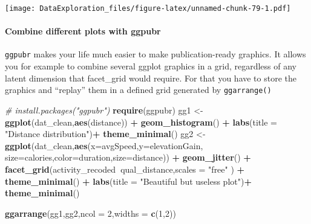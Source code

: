 \documentclass[
]{book}
\newenvironment{Shaded}{\begin{snugshade}}{\end{snugshade}}
\newcommand{\CommentTok}[1]{\textcolor[rgb]{0.56,0.35,0.01}{\textit{#1}}}
\newcommand{\DataTypeTok}[1]{\textcolor[rgb]{0.13,0.29,0.53}{#1}}
\newcommand{\DecValTok}[1]{\textcolor[rgb]{0.00,0.00,0.81}{#1}}
\newcommand{\KeywordTok}[1]{\textcolor[rgb]{0.13,0.29,0.53}{\textbf{#1}}}
\newcommand{\NormalTok}[1]{#1}
\newcommand{\OperatorTok}[1]{\textcolor[rgb]{0.81,0.36,0.00}{\textbf{#1}}}
\newcommand{\StringTok}[1]{\textcolor[rgb]{0.31,0.60,0.02}{#1}}
\begin{document}
\texttt{[image: DataExploration\_files/figure-latex/unnamed-chunk-79-1.pdf]}

\hypertarget{combine-different-plots-with-ggpubr}{%
\paragraph{Combine different plots with ggpubr}\label{combine-different-plots-with-ggpubr}}

\texttt{ggpubr} makes your life much easier to make publication-ready graphics. It allows you for example to combine several ggplot graphics in a grid, regardless of any latent dimension that facet\_grid would require. For that you have to store the graphics and ``replay'' them in a defined grid generated by \texttt{ggarrange()}

\begin{Shaded}
\begin{Highlighting}[]
\CommentTok{# install.packages("ggpubr")}
\KeywordTok{require}\NormalTok{(ggpubr)}
\NormalTok{gg1 <-}\StringTok{ }\KeywordTok{ggplot}\NormalTok{(dat_clean,}\KeywordTok{aes}\NormalTok{(distance)) }\OperatorTok{+}\StringTok{ }\KeywordTok{geom_histogram}\NormalTok{() }\OperatorTok{+}\StringTok{ }
\StringTok{  }\KeywordTok{labs}\NormalTok{(}\DataTypeTok{title =} \StringTok{"Distance distribution"}\NormalTok{)}\OperatorTok{+}
\StringTok{  }\KeywordTok{theme_minimal}\NormalTok{()}
\NormalTok{gg2 <-}\StringTok{ }\KeywordTok{ggplot}\NormalTok{(dat_clean,}\KeywordTok{aes}\NormalTok{(}\DataTypeTok{x=}\NormalTok{avgSpeed,}\DataTypeTok{y=}\NormalTok{elevationGain,}
                            \DataTypeTok{size=}\NormalTok{calories,}\DataTypeTok{color=}\NormalTok{duration,}\DataTypeTok{size=}\NormalTok{distance)) }\OperatorTok{+}\StringTok{ }
\StringTok{  }\KeywordTok{geom_jitter}\NormalTok{() }\OperatorTok{+}\StringTok{ }
\StringTok{  }\KeywordTok{facet_grid}\NormalTok{(activity_recoded}\OperatorTok{~}\NormalTok{qual_distance,}\DataTypeTok{scales =} \StringTok{"free"}\NormalTok{ ) }\OperatorTok{+}
\StringTok{  }\KeywordTok{theme_minimal}\NormalTok{() }\OperatorTok{+}\StringTok{ }\KeywordTok{labs}\NormalTok{(}\DataTypeTok{title =} \StringTok{"Beautiful but useless plot"}\NormalTok{)}\OperatorTok{+}
\StringTok{  }\KeywordTok{theme_minimal}\NormalTok{()}

\KeywordTok{ggarrange}\NormalTok{(gg1,gg2,}\DataTypeTok{ncol =} \DecValTok{2}\NormalTok{,}\DataTypeTok{widths =} \KeywordTok{c}\NormalTok{(}\DecValTok{1}\NormalTok{,}\DecValTok{2}\NormalTok{))}
\end{Highlighting}
\end{Shaded}
\end{document}
